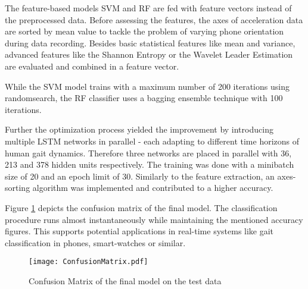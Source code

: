 The feature-based models \ac{SVM} and \ac{RF} are fed with feature vectors instead of the preprocessed data. Before assessing the features, the axes of acceleration data are sorted by mean value to tackle the problem of varying phone orientation during data recording. Besides basic statistical features like mean and variance, advanced features like the Shannon Entropy or the Wavelet Leader Estimation are evaluated and combined in a feature vector.

While the \ac{SVM} model trains with a maximum number of 200 iterations using randomsearch, the \ac{RF} classifier uses a bagging ensemble technique with 100 iterations.

Further the optimization process yielded the improvement by introducing multiple \ac{LSTM} networks in parallel - each adapting to different time horizons of human gait dynamics. Therefore three networks are placed in parallel with 36, 213 and 378 hidden units respectively. The training was done with a minibatch size of 20 and an epoch limit of 30. Similarly to the feature extraction, an axes-sorting algorithm was implemented and contributed to a higher accuracy.

Figure \ref{img:confmat} depicts the confusion matrix of the final model. The classification procedure runs almost instantaneously while maintaining the mentioned accuracy figures. This supports potential applications in real-time systems like gait classification in phones, smart-watches or similar.

\begin{figure}[hbtp]
\centering 
\texttt{[image: ConfusionMatrix.pdf]}
\caption{Confusion Matrix of the final model on the test data}
  \label{img:confmat}
\end{figure}


 
 